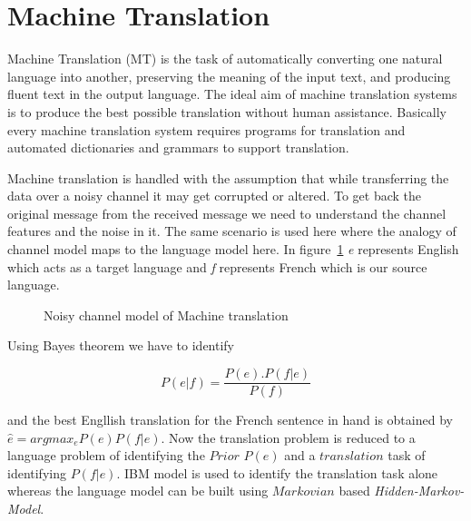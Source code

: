 \documentclass{bmcart}
\begin{document}
\section{Machine Translation}
\label{sec:machineTrans}
Machine Translation (MT) is the task of automatically converting one natural language into another, preserving the meaning of the input text, and producing fluent text in the output language.  The ideal aim of machine translation systems is to produce the best possible translation without human assistance. Basically every machine translation system requires programs for translation and automated dictionaries and grammars to support translation.

Machine translation is handled with the assumption that while transferring the data over a noisy channel it may get corrupted or altered. To get back the original message from the received message we need to understand the channel features and the noise in it. The same scenario is used here where the analogy of channel model maps to the language model here. In figure~\ref{fig:NosiyChannel}  {\it{e}} represents English which acts as a target language and {\it f} represents French which is our source language. 

\begin{figure}[h!tb]
\centering
{}
\caption{Noisy channel model of Machine translation}
\label{fig:NosiyChannel}
\end{figure}

Using Bayes theorem we have to identify 
\begin{center}
\begin{equation}
P(e|f)=\frac{P(e).P(f|e)}{	P(f)}
\end{equation}
\label{eqn:mtBayes}
\end{center}

and the best Engllish translation for the French sentence in hand is obtained by $\hat{e}=argmax_e P(e)P(f|e)$. Now the translation problem is reduced to a language problem of identifying the $Prior$ $P(e)$ and a $translation$ task of identifying $P(f|e)$. IBM model is used to identify the translation task alone whereas the language model can be built using $Markovian$ based {\it Hidden-Markov-Model}. 
\end{document}
